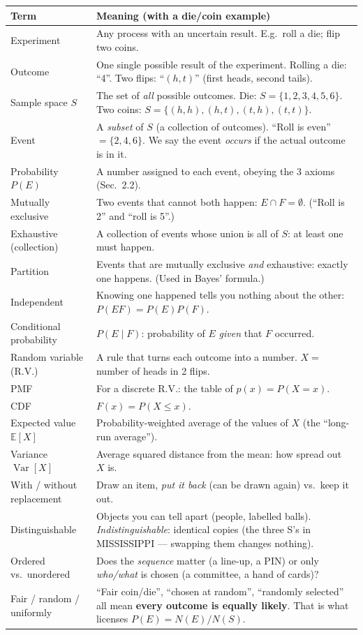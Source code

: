 \documentclass[11pt]{article}
\newcommand{\E}{\mathbb{E}}
\newcommand{\Var}{\operatorname{Var}}
\begin{document}
\begin{center}
\renewcommand{\arraystretch}{1.25}
\begin{tabular}{@{}>{\raggedright\arraybackslash}p{1.5in}>{\raggedright\arraybackslash}p{4.5in}@{}}
\toprule
\textbf{Term} & \textbf{Meaning (with a die/coin example)}\\
\midrule
Experiment & Any process with an uncertain result. E.g.\ roll a die; flip two coins.\\
Outcome & One single possible result of the experiment. Rolling a die: ``4''. Two flips: ``$(h,t)$'' (first heads, second tails).\\
Sample space $S$ & The set of \emph{all} possible outcomes. Die: $S=\{1,2,3,4,5,6\}$. Two coins: $S=\{(h,h),(h,t),(t,h),(t,t)\}$.\\
Event & A \emph{subset} of $S$ (a collection of outcomes). ``Roll is even'' $=\{2,4,6\}$. We say the event \emph{occurs} if the actual outcome is in it.\\
Probability $P(E)$ & A number assigned to each event, obeying the 3 axioms (Sec.~2.2).\\
Mutually exclusive & Two events that cannot both happen: $E\cap F=\emptyset$. (``Roll is 2'' and ``roll is 5''.)\\
Exhaustive (collection) & A collection of events whose union is all of $S$: at least one must happen.\\
Partition & Events that are mutually exclusive \emph{and} exhaustive: exactly one happens. (Used in Bayes' formula.)\\
Independent & Knowing one happened tells you nothing about the other: $P(EF)=P(E)P(F)$.\\
Conditional probability & $P(E\mid F)$: probability of $E$ \emph{given} that $F$ occurred.\\
Random variable (R.V.) & A rule that turns each outcome into a number. $X=$ number of heads in 2 flips.\\
PMF & For a discrete R.V.: the table of $p(x)=P(X=x)$.\\
CDF & $F(x)=P(X\le x)$.\\
Expected value $\E[X]$ & Probability-weighted average of the values of $X$ (the ``long-run average'').\\
Variance $\Var[X]$ & Average squared distance from the mean: how spread out $X$ is.\\
With / without replacement & Draw an item, \emph{put it back} (can be drawn again) vs.\ keep it out.\\
Distinguishable & Objects you can tell apart (people, labelled balls). \emph{Indistinguishable}: identical copies (the three S's in MISSISSIPPI --- swapping them changes nothing).\\
Ordered vs.\ unordered & Does the \emph{sequence} matter (a line-up, a PIN) or only \emph{who/what} is chosen (a committee, a hand of cards)?\\
Fair / random / uniformly & ``Fair coin/die'', ``chosen at random'', ``randomly selected'' all mean \textbf{every outcome is equally likely}. That is what licenses $P(E)=N(E)/N(S)$.\\
\bottomrule
\end{tabular}
\end{center}
\end{document}
